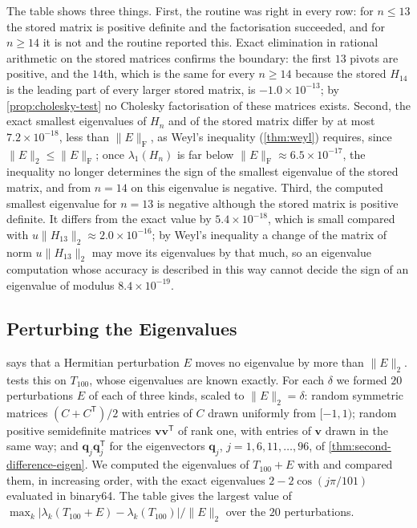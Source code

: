 The table shows three things. First, the routine was right in every row: for $n\le13$ the stored matrix is positive definite and the factorisation succeeded, and for $n\ge14$ it is not and the routine reported this. Exact elimination in rational arithmetic on the stored matrices confirms the boundary: the first $13$ pivots are positive, and the $14$th, which is the same for every $n\ge14$ because the stored $H_{14}$ is the leading part of every larger stored matrix, is $-1.0\times10^{-13}$; by \cref{prop:cholesky-test} no Cholesky factorisation of these matrices exists. Second, the exact smallest eigenvalues of $H_n$ and of the stored matrix differ by at most $7.2\times10^{-18}$, less than $\|E\|_{\mathrm F}$, as Weyl's inequality (\cref{thm:weyl}) requires, since $\|E\|_2\le\|E\|_{\mathrm F}$; once $\lambda_1(H_n)$ is far below $\|E\|_{\mathrm F}\approx6.5\times10^{-17}$, the inequality no longer determines the sign of the smallest eigenvalue of the stored matrix, and from $n=14$ on this eigenvalue is negative. Third, the computed smallest eigenvalue for $n=13$ is negative although the stored matrix is positive definite. It differs from the exact value by $5.4\times10^{-18}$, which is small compared with $u\|H_{13}\|_2\approx2.0\times10^{-16}$; by Weyl's inequality a change of the matrix of norm $u\|H_{13}\|_2$ may move its eigenvalues by that much, so an eigenvalue computation whose accuracy is described in this way cannot decide the sign of an eigenvalue of modulus $8.4\times10^{-19}$.

\subsection{Perturbing the Eigenvalues}

 says that a Hermitian perturbation $E$ moves no eigenvalue by more than $\|E\|_2$.  tests this on $T_{100}$, whose eigenvalues are known exactly. For each $\delta$ we formed $20$ perturbations $E$ of each of three kinds, scaled to $\|E\|_2=\delta$: random symmetric matrices $(C+C^{\mathsf T})/2$ with entries of $C$ drawn uniformly from $[-1,1)$; random positive semidefinite matrices $\mathbf v\mathbf v^{\mathsf T}$ of rank one, with entries of $\mathbf v$ drawn in the same way; and $\mathbf q_j\mathbf q_j^{\mathsf T}$ for the eigenvectors $\mathbf q_j$, $j=1,6,11,\ldots,96$, of \cref{thm:second-difference-eigen}. We computed the eigenvalues of $T_{100}+E$ with  and compared them, in increasing order, with the exact eigenvalues $2-2\cos(j\pi/101)$ evaluated in binary64. The table gives the largest value of $\max_k|\lambda_k(T_{100}+E)-\lambda_k(T_{100})|/\|E\|_2$ over the $20$ perturbations.

